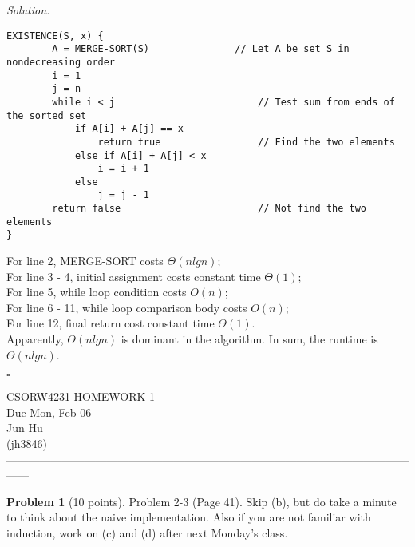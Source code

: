 \documentclass[11pt]{article}
\theoremstyle{definition}
\newtheorem{problem}{Problem}
\newenvironment{solution}{\noindent\emph{Solution.}}{\hfill$\square$}
\begin{document}
\begin{solution}
\begin{lstlisting}
EXISTENCE(S, x) { 
		A = MERGE-SORT(S)				// Let A be set S in nondecreasing order
		i = 1
		j = n
		while i < j							// Test sum from ends of the sorted set
			if A[i] + A[j] == x
				return true					// Find the two elements
			else if A[i] + A[j] < x
				i = i + 1
			else
				j = j - 1
		return false						// Not find the two elements
}
\end{lstlisting}
For line 2, MERGE-SORT costs $\Theta(nlgn)$; \\
For line 3 - 4, initial assignment costs constant time $\Theta(1)$;\\
For line 5, while loop condition costs $O(n)$;\\
For line 6 - 11, while loop comparison body costs $O(n)$;\\
For line 12, final return cost constant time $\Theta(1)$.\\
Apparently, $\Theta(nlgn)$ is dominant in the algorithm. In sum, the runtime is $\Theta(nlgn)$.


\end{solution}


\newpage
\begin{center}
\Large{} 
CSORW4231 HOMEWORK 1 \\
\normalsize{}
Due Mon, Feb 06 \\
\large{Jun Hu \\
(jh3846)} \\ 
------------------------------------------------------------------------------------------------------------------
\end{center}


\begin{problem}[10 points]
  Problem 2-3 (Page 41). Skip (b), but do take a minute to think about the naive implementation. Also if you are not familiar with induction, work on (c) and (d) after next Monday’s class.
\end{problem}
\end{document}
